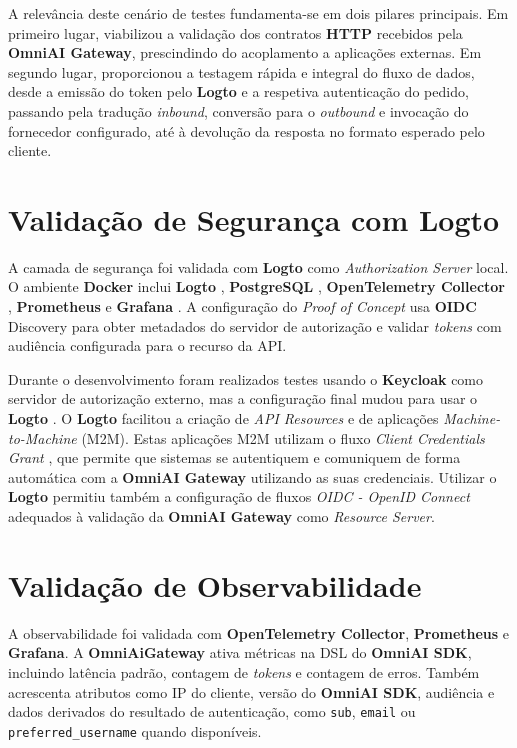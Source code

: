     A relevância deste cenário de testes fundamenta-se em dois pilares principais. Em primeiro lugar, viabilizou a validação dos contratos \textbf{HTTP} recebidos pela \textbf{OmniAI Gateway}, prescindindo do acoplamento a aplicações externas. Em segundo lugar, proporcionou a testagem rápida e integral do fluxo de dados, desde a emissão do token pelo \textbf{Logto} e a respetiva autenticação do pedido, passando pela tradução \textit{inbound}, conversão para o \textit{outbound} e invocação do fornecedor configurado, até à devolução da resposta no formato esperado pelo cliente.

    \section{Validação de Segurança com Logto}
    A camada de segurança foi validada com \textbf{Logto} como \textit{Authorization Server} local. O ambiente \textbf{Docker} inclui \textbf{Logto} \cite{logto_docs}, \textbf{PostgreSQL} \cite{postgresql_ref}, \textbf{OpenTelemetry Collector} \cite{opentelemetry_otlp}, \textbf{Prometheus} \cite{prometheus_ref} e \textbf{Grafana} \cite{grafana_ref}. A configuração do \textit{Proof of Concept} usa \textbf{OIDC} Discovery \cite{oidc_discovery} para obter metadados do servidor de autorização e validar \textit{tokens} com audiência configurada para o recurso da API.

    Durante o desenvolvimento foram realizados testes usando o \textbf{Keycloak} \cite{keycloak_docs} como servidor de autorização externo, mas a configuração final mudou para usar o \textbf{Logto} \cite{logto_docs}. O \textbf{Logto} facilitou a criação de \textit{API Resources} e de aplicações \textit{Machine-to-Machine} (M2M). Estas aplicações M2M utilizam o fluxo \textit{Client Credentials Grant} \cite{ref_ccG}, que permite que sistemas se autentiquem e comuniquem de forma automática com a \textbf{OmniAI Gateway} utilizando as suas credenciais. Utilizar o \textbf{Logto} permitiu também a configuração de fluxos \textit{OIDC - OpenID Connect} \cite{ref_oidc} adequados à validação da \textbf{OmniAI Gateway} como \textit{Resource Server}\cite{resource_ref}.


    \section{Validação de Observabilidade}
    A observabilidade foi validada com \textbf{OpenTelemetry Collector}, \textbf{Prometheus} e \textbf{Grafana}. A \textbf{OmniAiGateway} ativa métricas na DSL do \textbf{OmniAI SDK}, incluindo latência padrão, contagem de \textit{tokens} e contagem de erros. Também acrescenta atributos como IP do cliente, versão do \textbf{OmniAI SDK}, audiência e dados derivados do resultado de autenticação, como \texttt{sub}, \texttt{email} ou \texttt{preferred\_username} quando disponíveis.

